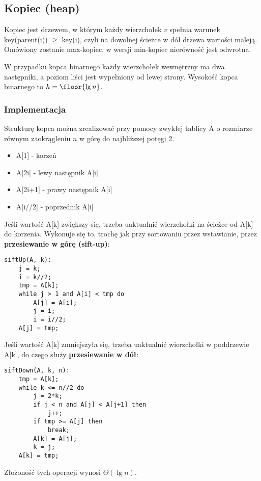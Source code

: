 \subsection{Kopiec (heap)}
Kopiec jest drzewem, w którym każdy wierzchołek \( v \) spełnia warunek key(parent(i)) \( \geq \) key(i), czyli na dowolnej ścieżce w dół drzewa wartości maleją.
Omówiony zostanie max-kopiec, w wersji min-kopiec nierówność jest odwrotna.

W przypadku kopca binarnego każdy wierzchołek wewnętrzny ma dwa następniki, a poziom liści jest wypełniony od lewej strony.
Wysokość kopca binarnego to \( h = \floor{\lg n} \).

\subsubsection*{Implementacja}
Strukturę kopca można zrealizować przy pomocy zwykłej tablicy A o rozmiarze równym zaokrągleniu \( n \) w górę do najbliższej potęgi 2.
\begin{itemize}
    \item A[1] - korzeń
    \item A[2i] - lewy następnik A[i]
    \item A[2i+1] - prawy następnik A[i]
    \item A[i/\!/2] - poprzednik A[i]
\end{itemize}

Jeśli wartość A[k] zwiększy się, trzeba uaktualnić wierzchołki na ścieżce od A[k] do korzenia.
Wykonuje się to, trochę jak przy sortowaniu przez wstawianie, przez \textbf{przesiewanie w górę (sift-up)}:
\begin{verbatim}
siftUp(A, k):
    j = k;
    i = k//2;
    tmp = A[k];
    while j > 1 and A[i] < tmp do
        A[j] = A[i];
        j = i;
        i = i//2;
    A[j] = tmp;
\end{verbatim}

Jeśli wartość A[k] zmniejszyła się, trzeba uaktualnić wierzchołki w poddrzewie A[k], do czego służy \textbf{przesiewanie w dół}:
\begin{verbatim}
siftDown(A, k, n):
    tmp = A[k];
    while k <= n//2 do
        j = 2*k;
        if j < n and A[j] < A[j+1] then
            j++;
        if tmp >= A[j] then
            break;
        A[k] = A[j];
        k = j;
    A[k] = tmp;
\end{verbatim}
Złożoność tych operacji wynosi \( \Theta(\lg n) \).


